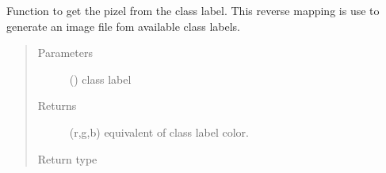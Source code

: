 \documentclass[letterpaper,10pt,english]{sphinxmanual}
\begin{document}
\begin{fulllineitems}
\label{\detokenize{basefunctions:basefunctions.getPixelFromLabel}}
Function to get the pizel from the class label. This reverse mapping is use to generate an image file fom available class labels.
\begin{quote}\begin{description}
\item[{Parameters}] \leavevmode
{} () \textendash{} class label

\item[{Returns}] \leavevmode
(r,g,b) equivalent of class label color.

\item[{Return type}] \leavevmode
{}

\end{description}\end{quote}

\end{fulllineitems}

\end{document}
